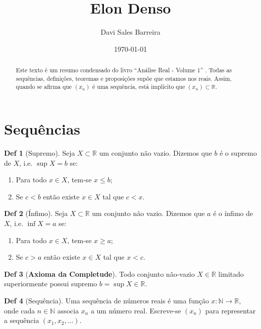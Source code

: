 \documentclass[journal, letterpaper]{IEEEtran}
\title{Elon Denso}
\author{Davi Sales Barreira}
\date{\today}
\theoremstyle{definition}
\newtheorem{definition}{Def}[section]
\begin{document}
\maketitle
\begin{abstract}
	Este texto é um resumo condensado do livro ``Análise Real - Volume 1''
	\citep{lima2004analise}. Todas as sequências, definições, teoremas e proposições
	supõe que estamos nos reais. Assim, quando se afirma que $(x_n)$ é uma sequência,
	está implícito que $(x_n) \subset \mathbb R$.
\end{abstract}

\section{Sequências} %
\label{sec:Sequências}

\begin{definition}[Supremo]
	Seja $X \subset \mathbb R$ um conjunto não vazio. Dizemos que
	$b$ é o supremo de $X$, i.e. $\sup X = b$ se:
	\begin{enumerate}
		\item Para todo $x \in X$, tem-se $x \leq b$;
		\item Se $c<b$ então existe $x \in X$ tal que $c<x$.
	\end{enumerate}
\end{definition}

\begin{definition}[Ínfimo]
	Seja $X \subset \mathbb R$ um conjunto não vazio. Dizemos que
	$a$ é o ínfimo de $X$, i.e. $\inf X = a$ se:
	\begin{enumerate}
		\item Para todo $x \in X$, tem-se $x \geq a$;
		\item Se $c>a$ então existe $x \in X$ tal que $x<c$.
	\end{enumerate}
\end{definition}

\begin{definition}[\textbf{Axioma da Completude}]
	Todo conjunto não-vazio $X \in \mathbb R$ limitado superiormente possui
	supremo $b = \sup X \in \mathbb R$.
\end{definition}

\begin{definition}[Sequência]
	Uma sequência de números reais é uma função $x: \mathbb N \to \mathbb R$,
	onde cada $n \in \mathbb N$ associa $x_n$ a um número real. Escreve-se
	$(x_n)$ para representar a sequência $(x_1,x_2,...)$.
\end{definition}
\end{document}
